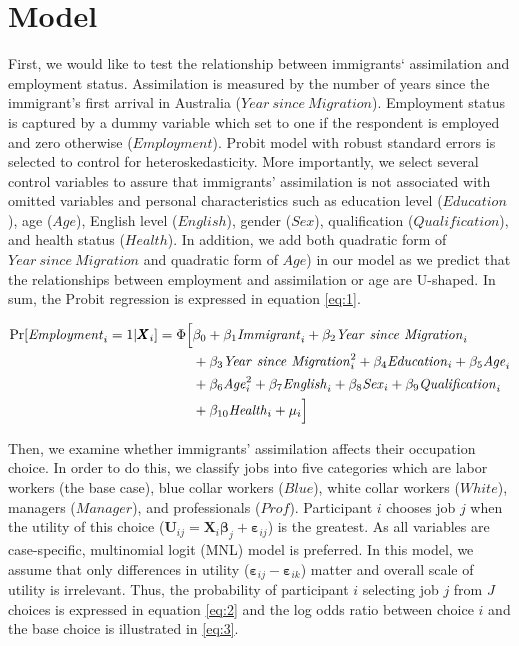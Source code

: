 
\section{Model}
\label{sec:model}

First, we would like to test the relationship between immigrants‘ assimilation and employment status.
Assimilation is measured by the number of years since the immigrant's first arrival in Australia ($\mathit{Year\ since\ Migration}$).
Employment status is captured by a dummy variable which set to one if the respondent is employed and zero otherwise ($\mathit{Employment}$).
Probit model with robust standard errors is selected to control for heteroskedasticity.
More importantly, we select several control variables to assure that immigrants' assimilation is not associated with omitted variables and personal characteristics such as education level ($\mathit{Education}$), age ($\mathit{Age}$), English level ($\mathit{English}$), gender ($\mathit{Sex}$), qualification ($\mathit{Qualification}$), and health status ($\mathit{Health}$).
In addition, we add both quadratic form of $\mathit{Year\ since\ Migration}$ and quadratic form of $\mathit{Age}$) in our model as we predict that the relationships between employment and assimilation or age are U-shaped.
In sum, the Probit regression is expressed in equation \eqref{eq:1}.

\begin{equation}
  \label{eq:1}
  \begin{aligned}
  \mathrm{Pr}[\mathit{Employment}_i=1|\pmb{X}_i]
  = \Phi \Bigl[
    &\beta_0
    + \beta_1 \mathit{Immigrant}_i
    + \beta_2 \mathit{Year\ since\ Migration}_i \\
    & + \beta_3 \mathit{Year\ since\ Migration}_i^2
    + \beta_4 \mathit{Education}_i
    + \beta_5 \mathit{Age}_i \\
    &+ \beta_6 \mathit{Age}_i^2
    + \beta_7 \mathit{English}_i
    + \beta_8 \mathit{Sex}_i
    + \beta_9 \mathit{Qualification}_i \\
    &+ \beta_{10} \mathit{Health}_i
    + \mu_i
    \Bigr]
  \end{aligned}
\end{equation}

Then, we examine whether immigrants' assimilation affects their occupation choice.
In order to do this, we classify jobs into five categories which are labor workers (the base case), blue collar workers ($\mathit{Blue}$), white collar workers ($\mathit{White}$), managers ($\mathit{Manager}$), and professionals ($\mathit{Prof}$).
Participant $i$ chooses job $j$ when the utility of this choice ($\pmb{U}_{ij} = \pmb{X}_i \pmb{\beta}_{j} + \pmb{\varepsilon}_{ij}$) is the greatest.
As all variables are case-specific, multinomial logit (MNL) model is preferred.
In this model, we assume that only differences in utility ($\pmb{\varepsilon}_{ij} - \pmb{\varepsilon}_{ik}$) matter and overall scale of utility is irrelevant.
Thus, the probability of participant $i$ selecting job $j$ from $J$ choices is expressed in equation \eqref{eq:2} and the log odds ratio between choice $i$ and the base choice is illustrated in \eqref{eq:3}.


